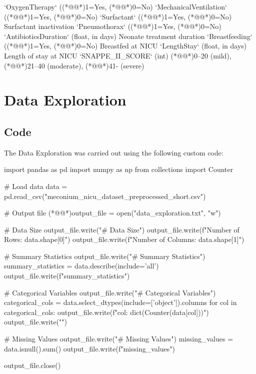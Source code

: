 \documentclass[11pt]{article}
\begin{document}
\begin{codeoutput}
`OxygenTherapy` ((*@@*)1=Yes, (*@@*)0=No)
`MechanicalVentilation` ((*@@*)1=Yes, (*@@*)0=No)
`Surfactant` ((*@@*)1=Yes, (*@@*)0=No) Surfactant inactivation
`Pneumothorax` ((*@@*)1=Yes, (*@@*)0=No)
`AntibioticsDuration` (float, in days) Neonate treatment duration
`Breastfeeding` ((*@@*)1=Yes, (*@@*)0=No) Breastfed at NICU
`LengthStay` (float, in days) Length of stay at NICU
`SNAPPE\_II\_SCORE` (int) (*@@*)0--20 (mild), (*@@*)21--40 (moderate), (*@@*)41- (severe)



\end{codeoutput}

\section{Data Exploration}
\subsection{{Code}}
The Data Exploration was carried out using the following custom code:

\begin{python}

import pandas as pd
import numpy as np
from collections import Counter

# Load data
data = pd.read_csv("meconium_nicu_dataset_preprocessed_short.csv")

# Output file
(*@@*)output_file = open("data_exploration.txt", "w")

# Data Size
output_file.write("# Data Size\n")
output_file.write(f"Number of Rows: {data.shape[0]}\n")
output_file.write(f"Number of Columns: {data.shape[1]}\n\n")

# Summary Statistics
output_file.write("# Summary Statistics\n")
summary_statistics = data.describe(include='all')
output_file.write(f"{summary_statistics}\n\n")

# Categorical Variables
output_file.write("# Categorical Variables\n")
categorical_cols = data.select_dtypes(include=['object']).columns
for col in categorical_cols:
    output_file.write(f"{col}: {dict(Counter(data[col]))}\n")
output_file.write("\n")

# Missing Values
output_file.write("# Missing Values\n")
missing_values = data.isnull().sum()
output_file.write(f"{missing_values}\n\n")

output_file.close()

\end{python}
\end{document}
